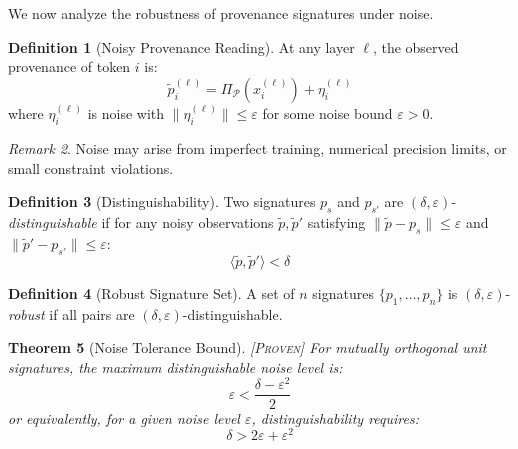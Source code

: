 \documentclass[11pt,a4paper]{article}
\theoremstyle{plain}
\newtheorem{theorem}{Theorem}[section]
\theoremstyle{definition}
\newtheorem{definition}[theorem]{Definition}
\theoremstyle{remark}
\newtheorem{remark}[theorem]{Remark}
\newcommand{\Pspace}{\mathcal{P}}
\newcommand{\ip}[2]{\langle #1, #2 \rangle}
\newcommand{\norm}[1]{\| #1 \|}
\newcommand{\proj}[1]{\Pi_{#1}}
\newcommand{\proven}{\textsc{[Proven]}}
\begin{document}
We now analyze the robustness of provenance signatures under noise.

\begin{definition}[Noisy Provenance Reading] \label{def:noisy}
At any layer $\ell$, the observed provenance of token $i$ is:
\begin{equation}
\tilde{p}_i^{(\ell)} = \proj{\Pspace}(x_i^{(\ell)}) + \eta_i^{(\ell)}
\end{equation}
where $\eta_i^{(\ell)}$ is noise with $\norm{\eta_i^{(\ell)}} \leq \varepsilon$ for some noise bound $\varepsilon > 0$.
\end{definition}

\begin{remark}
Noise may arise from imperfect training, numerical precision limits, or small constraint violations.
\end{remark}

\begin{definition}[Distinguishability] \label{def:distinguish}
Two signatures $p_s$ and $p_{s'}$ are $(\delta, \varepsilon)$-\emph{distinguishable} if for any noisy observations $\tilde{p}, \tilde{p}'$ satisfying $\norm{\tilde{p} - p_s} \leq \varepsilon$ and $\norm{\tilde{p}' - p_{s'}} \leq \varepsilon$:
\begin{equation}
\ip{\tilde{p}}{\tilde{p}'} < \delta
\end{equation}
\end{definition}

\begin{definition}[Robust Signature Set] \label{def:robust}
A set of $n$ signatures $\{p_1, \ldots, p_n\}$ is $(\delta, \varepsilon)$-\emph{robust} if all pairs are $(\delta, \varepsilon)$-distinguishable.
\end{definition}

\begin{theorem}[Noise Tolerance Bound] \label{thm:noise} \proven
For mutually orthogonal unit signatures, the maximum distinguishable noise level is:
\begin{equation}
\varepsilon < \frac{\delta - \varepsilon^2}{2}
\end{equation}
or equivalently, for a given noise level $\varepsilon$, distinguishability requires:
\begin{equation}
\delta > 2\varepsilon + \varepsilon^2
\end{equation}
\end{theorem}
\end{document}
